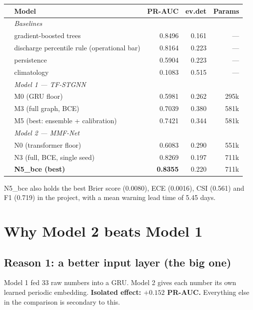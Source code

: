 \documentclass[11pt,a4paper]{article}
\newcommand{\good}[1]{\textcolor{green!45!black}{\textbf{#1}}}
\begin{document}
\begin{table}[h]
\centering
\small
\begin{tabular}{@{}llrrr@{}}
\toprule
& \textbf{Model} & \textbf{PR-AUC} & \textbf{ev.det} & \textbf{Params} \\
\midrule
& \textit{Baselines} & & & \\
& gradient-boosted trees & 0.8496 & 0.161 & --- \\
& discharge percentile rule (operational bar) & 0.8164 & 0.223 & --- \\
& persistence & 0.5904 & 0.223 & --- \\
& climatology & 0.1083 & 0.515 & --- \\
\midrule
& \textit{Model 1 --- TF-STGNN} & & & \\
& M0 (GRU floor) & 0.5981 & 0.262 & 295k \\
& M3 (full graph, BCE) & 0.7039 & 0.380 & 581k \\
& M5 (best: ensemble + calibration) & 0.7421 & 0.344 & 581k \\
\midrule
& \textit{Model 2 --- MMF-Net} & & & \\
& N0 (transformer floor) & 0.6083 & 0.290 & 551k \\
& N3 (full, BCE, single seed) & 0.8269 & 0.197 & 711k \\
& \textbf{N5\_bce (best)} & \good{0.8355} & 0.220 & 711k \\
\bottomrule
\end{tabular}
\end{table}

\noindent
N5\_bce also holds the best Brier score (0.0080), ECE (0.0016), CSI (0.561) and
F1 (0.719) in the project, with a mean warning lead time of 5.45 days.

\section{Why Model 2 beats Model 1}

\subsection{Reason 1: a better input layer (the big one)}

Model 1 fed 33 raw numbers into a GRU. Model 2 gives each number its own learned
periodic embedding. \textbf{Isolated effect: $+0.152$ PR-AUC.} Everything else in
the comparison is secondary to this.
\end{document}
